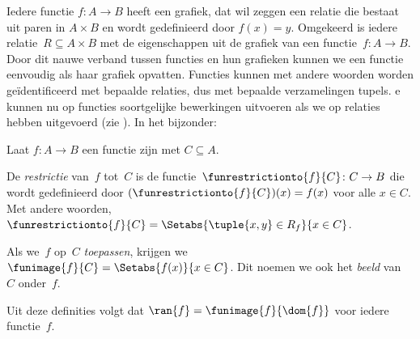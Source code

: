 \documentclass[../../../include/open-logic-section]{subfiles}
\begin{document}
\begin{explain}
Iedere functie $f\colon A \to B$ heeft een grafiek, dat wil zeggen een
relatie die bestaat uit paren in $A \times B$ en wordt gedefinieerd
door $f(x) = y$.
Omgekeerd is iedere relatie~$R \subseteq A \times B$ met de
eigenschappen uit  de grafiek van een
functie~$f \colon A \to B$. Door dit nauwe verband tussen functies en
hun grafieken kunnen we een functie eenvoudig als haar grafiek
opvatten. Functies kunnen met andere woorden worden geïdentificeerd
met bepaalde relaties, dus met bepaalde verzamelingen tupels.
e
kunnen nu op functies soortgelijke bewerkingen uitvoeren als we op
relaties hebben uitgevoerd (zie ). In het
bijzonder:
\end{explain}

\begin{defn}
Laat $f \colon A \to B$ een functie zijn met $C\subseteq A$.

De \emph{restrictie} van~$f$ tot~$C$ is de
functie~$\funrestrictionto{f}{C}\colon C \to B$ die wordt gedefinieerd
door $(\funrestrictionto{f}{C})(x) = f(x)$ voor alle $x \in C$. Met
andere woorden, $\funrestrictionto{f}{C} = \Setabs{\tuple{x, y} \in
R_f}{x \in C}$.

Als we~$f$ op~$C$ \emph{toepassen}, krijgen we $\funimage{f}{C} =
\Setabs{f(x)}{x \in C}$. Dit noemen we ook het \emph{beeld} van~$C$
onder~$f$.
\end{defn}

\begin{explain}
Uit deze definities volgt dat $\ran{f} =
\funimage{f}{\dom{f}}$ voor iedere functie~$f$.
\end{explain}
\end{document}
